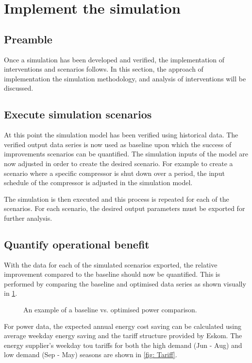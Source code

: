 \section{Implement the simulation}
	\subsection{Preamble}
		Once a simulation has been developed and verified, the implementation of interventions and scenarios follows. In this section, the approach of implementation the simulation methodology, and analysis of interventions will be discussed.
	\subsection{Execute simulation scenarios}
		At this point the simulation model has been verified using historical data. The verified output data series is now used as baseline upon which the success of improvements scenarios can be quantified. The simulation inputs of the model are now adjusted in order to create the desired scenario. For example to create a scenario where a specific compressor is shut down over a period, the input schedule of the compressor is adjusted in the simulation model.
		\par
		The simulation is then executed and this process is repeated for each of the scenarios. For each scenario, the desired output parameters must be exported for further analysis.

	\subsection{Quantify operational benefit}
		With the data for each of the simulated scenarios exported, the relative improvement compared to the baseline should now be quantified. This is performed by comparing the baseline and optimised data series as shown visually in \cref{fig: Savings Power.}.
		\begin{figure}[h]
			\centering
			
			\caption{An example of a baseline vs. optimised power comparison.}
			\label{fig: Savings Power.}
		\end{figure}  
		For power data, the expected annual energy cost saving can be calculated using  average weekday energy saving and the tariff structure provided by Eskom. The energy supplier's weekday \gls{tou} tariffs for both the high demand (Jun - Aug) and low demand (Sep - May) seasons are shown in \cref{fig: Tariff}.


